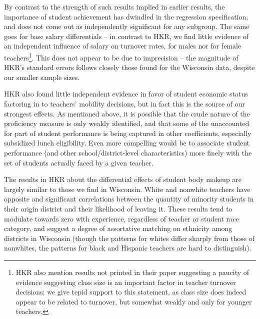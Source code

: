 By contrast to the strength of such results implied in earlier results,
the importance of student achievement has dwindled in the regression
specification, and does not come out as independently significant for
any subgroup. The same goes for base salary differentials -- in contrast
to HKR, we find little evidence of an independent influence of salary on
turnover rates, for males nor for female teachers\footnote{HKR also
  mention results not printed in their paper suggesting a paucity of
  evidence suggesting class size is an important factor in teacher
  turnover decisions; we give tepid support to this statement, as class
  size does indeed appear to be related to turnover, but somewhat weakly
  and only for younger teachers.}. This does not appear to be due to
imprecision -- the magnitude of HKR's standard errors follows closely
those found for the Wisconsin data, despite our smaller sample sizes.

HKR also found little independent evidence in favor of student economic
status factoring in to teachers' mobility decisions, but in fact this is
the source of our strongest effects. As mentioned above, it is possible
that the crude nature of the proficiency measure is only weakly
identified, and that some of the unaccounted for part of student
performance is being captured in other coefficients, especially
subsidized lunch eligibility. Even more compelling would be to associate
student performance (and other school/district-level characteristics)
more finely with the set of students actually faced by a given teacher.

The results in HKR about the differential effects of student body makeup
are largely similar to those we find in Wisconsin. White and nonwhite
teachers have opposite and significant correlations between the quantity
of minority students in their origin district and their likelihood of
leaving it. These results tend to modulate towards zero with experience,
regardless of teacher or student race category, and suggest a degree of
assortative matching on ethnicity among districts in Wisconsin (though
the patterns for whites differ sharply from those of nonwhites, the
patterns for black and Hispanic teachers are hard to distinguish).

